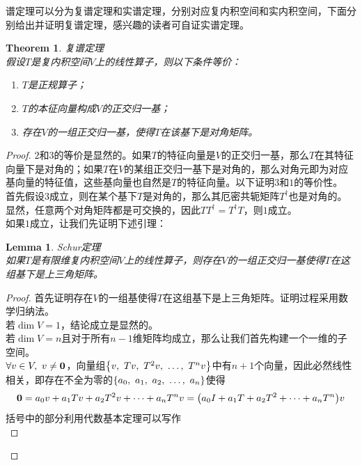 \documentclass[12pt,a4paper,openany,twoside]{book}
\newtheorem{theorem}{Theorem}[section]
\newtheorem{lemma}{Lemma}
\numberwithin{equation}{section}
\begin{document}
        谱定理可以分为复谱定理和实谱定理，分别对应复内积空间和实内积空间，下面分别给出并证明复谱定理，感兴趣的读者可自证实谱定理。
        \begin{theorem} 复谱定理\\
          假设$T$是复内积空间$V$上的线性算子，则以下条件等价：
          \begin{enumerate}
            \item $T$是正规算子；
            \item $T$的本征向量构成$V$的正交归一基；
            \item 存在$V$的一组正交归一基，使得$T$在该基下是对角矩阵。
          \end{enumerate}
        \end{theorem}
        \begin{proof}
          $2$和$3$的等价是显然的。如果$T$的特征向量是$V$的正交归一基，那么$T$在其特征向量下是对角的；如果$T$在$V$的某组正交归一基下是对角的，那么对角元即为对应基向量的特征值，这些基向量也自然是$T$的特征向量。以下证明$3$和$1$的等价性。\\
          首先假设$3$成立，则在某个基下$T$是对角的，那么其厄密共轭矩阵$T^\dagger$也是对角的。显然，任意两个对角矩阵都是可交换的，因此$TT^\dagger=T^\dagger T$，则$1$成立。\\
          如果$1$成立，让我们先证明下述引理：
          \begin{lemma} Schur定理\\
            如果$T$是有限维复内积空间$V$上的线性算子，则存在$V$的一组正交归一基使得$T$在这组基下是上三角矩阵。
          \end{lemma}
          \begin{proof}
            首先证明存在$V$的一组基使得$T$在这组基下是上三角矩阵。证明过程采用数学归纳法。\\
            若$\dim V=1$，结论成立是显然的。\\
            若$\dim V=n$且对于所有$n-1$维矩阵均成立，那么让我们首先构建一个一维的子空间。\\
            $\forall v\in V,\ v\neq\vb{0}$，向量组$\qty{v,\ Tv,\ T^2v,\ \dots,\ T^nv}$中有$n+1$个向量，因此必然线性相关，即存在不全为零的$\qty{a_0,\ a_1,\ a_2,\ \dots,\ a_n}$使得
            \begin{equation}
              \vb{0}=a_0v+a_1Tv+a_2T^2v+\dots+a_nT^nv=\qty(a_0I+a_1T+a_2T^2+\dots+a_nT^n)v
            \end{equation}
            括号中的部分利用代数基本定理可以写作
            \begin{equation}

\end{equation}
\end{proof}
\end{proof}
\end{document}

